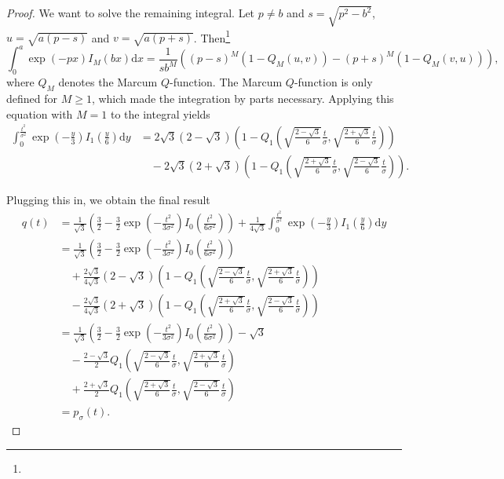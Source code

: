 \documentclass[a4paper,12pt]{article}
\theoremstyle{plain}
\theoremstyle{definition}
\begin{document}
\begin{proof}
	We want to solve the remaining integral. Let $p \neq b$ and $s = \sqrt{p^2 - b^2}$, $u = \sqrt{a (p - s)}$ and $v = \sqrt{a (p + s)}$. Then\footnote{}
	\begin{equation}\label{eq: intmarcum}
		\int_0^a \exp(-p x) I_M ( b x ) \mathrm{d}x = \frac{1}{s b^M} \left( (p - s)^M ( 1 - Q_M(u, v) ) - (p + s)^M ( 1 - Q_M(v, u) ) \right),
	\end{equation}
	where $Q_M$ denotes the Marcum $Q$-function. The Marcum $Q$-function is only defined for $M \geq 1$, which made the integration by parts necessary. Applying this equation with $M = 1$ to the integral yields
	\begin{align*}
		\int_0^\frac{t^2}{\sigma^2} \exp \left( - \frac{y}{3} \right) I_1 \left( \frac{y}{6} \right) \mathrm{d}y &= 2 \sqrt{3} (2 - \sqrt{3}) \left( 1 - Q_1 \left( \sqrt{\frac{2 - \sqrt{3}}{6}} \frac{t}{\sigma}, \sqrt{\frac{2 + \sqrt{3}}{6}} \frac{t}{\sigma} \right) \right) \\
		&\quad - 2 \sqrt{3} (2 + \sqrt{3}) \left( 1 - Q_1 \left( \sqrt{\frac{2 + \sqrt{3}}{6}} \frac{t}{\sigma}, \sqrt{\frac{2 - \sqrt{3}}{6}} \frac{t}{\sigma} \right) \right).
	\end{align*}
	
	Plugging this in, we obtain the final result
	\begin{align*}
		q(t) &= \frac{1}{\sqrt{3}} \left( \frac{3}{2} - \frac{3}{2} \exp \left( - \frac{t^2}{3 \sigma^2} \right) I_0 \left( \frac{t^2}{6 \sigma^2} \right) \right) + \frac{1}{4 \sqrt{3}} \int_0^\frac{t^2}{\sigma^2} \exp \left( - \frac{y}{3} \right) I_1 \left( \frac{y}{6} \right) \mathrm{d}y \\
		&= \frac{1}{\sqrt{3}} \left( \frac{3}{2} - \frac{3}{2} \exp \left( - \frac{t^2}{3 \sigma^2} \right) I_0 \left( \frac{t^2}{6 \sigma^2} \right) \right) \\
		&\quad + \frac{2 \sqrt{3}}{4 \sqrt{3}} (2 - \sqrt{3}) \left( 1 - Q_1 \left( \sqrt{\frac{2 - \sqrt{3}}{6}} \frac{t}{\sigma}, \sqrt{\frac{2 + \sqrt{3}}{6}} \frac{t}{\sigma} \right) \right) \\
		&\quad - \frac{2 \sqrt{3}}{4 \sqrt{3}} (2 + \sqrt{3}) \left( 1 - Q_1 \left( \sqrt{\frac{2 + \sqrt{3}}{6}} \frac{t}{\sigma}, \sqrt{\frac{2 - \sqrt{3}}{6}} \frac{t}{\sigma} \right) \right) \\
		&= \frac{1}{\sqrt{3}} \left( \frac{3}{2} - \frac{3}{2} \exp \left( - \frac{t^2}{3 \sigma^2} \right) I_0 \left( \frac{t^2}{6 \sigma^2} \right) \right) - \sqrt{3} \\
		&\quad - \frac{2 - \sqrt{3}}{2} Q_1 \left( \sqrt{\frac{2 - \sqrt{3}}{6}} \frac{t}{\sigma}, \sqrt{\frac{2 + \sqrt{3}}{6}} \frac{t}{\sigma} \right) \\
		&\quad + \frac{2 + \sqrt{3}}{2} Q_1 \left( \sqrt{\frac{2 + \sqrt{3}}{6}} \frac{t}{\sigma}, \sqrt{\frac{2 - \sqrt{3}}{6}} \frac{t}{\sigma} \right) \\
		&= p_\sigma(t).
	\end{align*}
	

\end{proof}
\end{document}
